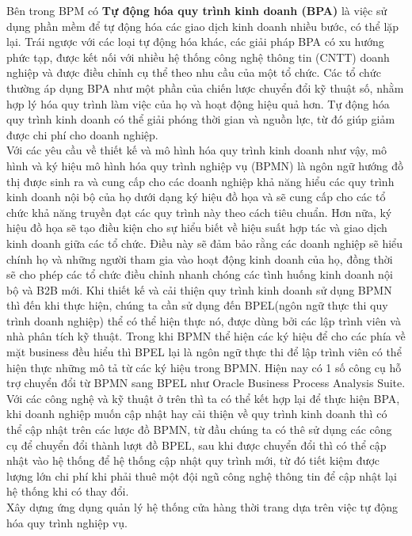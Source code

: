         
        Bên trong BPM có \textbf{Tự động hóa quy trình kinh doanh (BPA)} là việc sử dụng phần mềm để tự động hóa các giao dịch kinh doanh nhiều bước, có thể lặp lại. Trái ngược với các loại tự động hóa khác, các giải pháp BPA có xu hướng phức tạp, được kết nối với nhiều hệ thống công nghệ thông tin (CNTT) doanh nghiệp và được điều chỉnh cụ thể theo nhu cầu của một tổ chức. Các tổ chức thường áp dụng BPA như một phần của chiến lược chuyển đổi kỹ thuật số, nhằm hợp lý hóa quy trình làm việc của họ và hoạt động hiệu quả hơn. Tự động hóa quy trình kinh doanh có thể giải phóng thời gian và nguồn lực, từ đó giúp giảm được chi phí cho doanh nghiệp.\\
        Với các yêu cầu về thiết kế và mô hình hóa quy trình kinh doanh như vậy, mô hình và ký hiệu mô hình hóa quy trình nghiệp vụ (BPMN) là ngôn ngữ hướng đồ thị được sinh ra và cung cấp cho các doanh nghiệp khả năng hiểu các quy trình kinh doanh nội bộ của họ dưới dạng ký hiệu đồ họa và sẽ cung cấp cho các tổ chức khả năng truyền đạt các quy trình này theo cách tiêu chuẩn. Hơn nữa, ký hiệu đồ họa sẽ tạo điều kiện cho sự hiểu biết về hiệu suất hợp tác và giao dịch kinh doanh giữa các tổ chức. Điều này sẽ đảm bảo rằng các doanh nghiệp sẽ hiểu chính họ và những người tham gia vào hoạt động kinh doanh của họ, đồng thời sẽ cho phép các tổ chức điều chỉnh nhanh chóng các tình huống kinh doanh nội bộ và B2B mới. Khi thiết kế và cải thiện quy trình kinh doanh sử dụng BPMN thì đến khi thực hiện, chúng ta cần sử dụng đến BPEL(ngôn ngữ thực thi quy trình doanh nghiệp) thể có thể hiện thực nó, được dùng bởi các lập trình viên và nhà phân tích kỹ thuật. Trong khi BPMN thể hiện các ký hiệu để cho các phía về mặt business đều hiểu thì BPEL lại là ngôn ngữ thực thi để lập trình viên có thể hiện thực những mô tả từ các ký hiệu trong BPMN. Hiện nay có 1 số công cụ hỗ trợ chuyển đổi từ BPMN sang BPEL như Oracle Business Process Analysis Suite. Với các công nghệ và kỹ thuật ở trên thì ta có thể kết hợp lại để thực hiện BPA, khi doanh nghiệp muốn cập nhật hay cải thiện về quy trình kinh doanh thì có thể cập nhật trên các lược đồ BPMN, từ đầu chúng ta có thê sử dụng các công cụ để chuyển đổi thành lượt đồ BPEL, sau khi được chuyển đổi thì có thể cập nhật vào hệ thống để hệ thống cập nhật quy trình mới, từ đó tiết kiệm được lượng lớn chi phí khi phải thuê một đội ngũ công nghệ thông tin để cập nhật lại hệ thống khi có thay đổi. \\
        
        
        Xây dựng ứng dụng quản lý hệ thống cửa hàng thời trang dựa trên việc tự động hóa quy trình nghiệp vụ.\\
